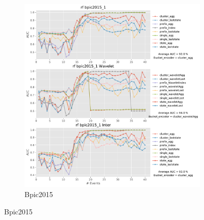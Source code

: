 \begin{figure}[!htbp]
\begin{subfigure}{0.48\textwidth}
		\includegraphics[width=\linewidth]{images/inter/rf/bpic2015_1.pdf}
		\caption{Bpic2015} \label{fig:b151i}
	\end{subfigure}
	

\end{figure}
